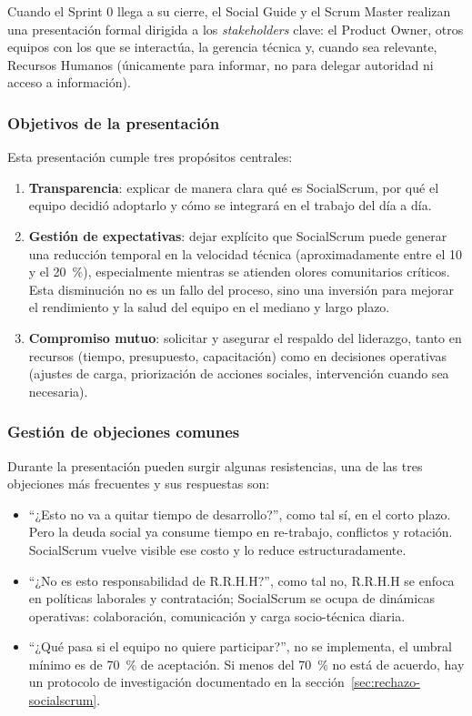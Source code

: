 Cuando el Sprint 0 llega a su cierre, el Social Guide y el Scrum Master realizan una presentación formal dirigida a los \textit{stakeholders} clave: el Product Owner, otros equipos con los que se interactúa, la gerencia técnica y, cuando sea relevante, Recursos Humanos (únicamente para informar, no para delegar autoridad ni acceso a información).

\subsubsection{Objetivos de la presentación}

Esta presentación cumple tres propósitos centrales:

\begin{enumerate}
    \item \textbf{Transparencia}: explicar de manera clara qué es SocialScrum, por qué el equipo decidió adoptarlo y cómo se integrará en el trabajo del día a día.

    \item \textbf{Gestión de expectativas}: dejar explícito que SocialScrum puede generar una reducción temporal en la velocidad técnica (aproximadamente entre el 10 y el 20~\%), especialmente mientras se atienden olores comunitarios críticos. Esta disminución no es un fallo del proceso, sino una inversión para mejorar el rendimiento y la salud del equipo en el mediano y largo plazo.

    \item \textbf{Compromiso mutuo}: solicitar y asegurar el respaldo del liderazgo, tanto en recursos (tiempo, presupuesto, capacitación) como en decisiones operativas (ajustes de carga, priorización de acciones sociales, intervención cuando sea necesaria).
\end{enumerate}

\subsubsection{Gestión de objeciones comunes}

Durante la presentación pueden surgir algunas resistencias, una de las tres objeciones más frecuentes y sus respuestas son:
\begin{itemize}
    \item ``¿Esto no va a quitar tiempo de desarrollo?'', como tal sí, en el corto plazo. Pero la deuda social ya consume tiempo en re-trabajo, conflictos y rotación. SocialScrum vuelve visible ese costo y lo reduce estructuradamente.
    \item ``¿No es esto responsabilidad de R.R.H.H?'', como tal no, R.R.H.H se enfoca en políticas laborales y contratación; SocialScrum se ocupa de dinámicas operativas: colaboración, comunicación y carga socio-técnica diaria.
    \item ``¿Qué pasa si el equipo no quiere participar?'', no se implementa, el umbral mínimo es de 70~\% de aceptación. Si menos del 70~\% no está de acuerdo, hay un protocolo de investigación documentado en la sección~\ref{sec:rechazo-socialscrum}.
\end{itemize}

